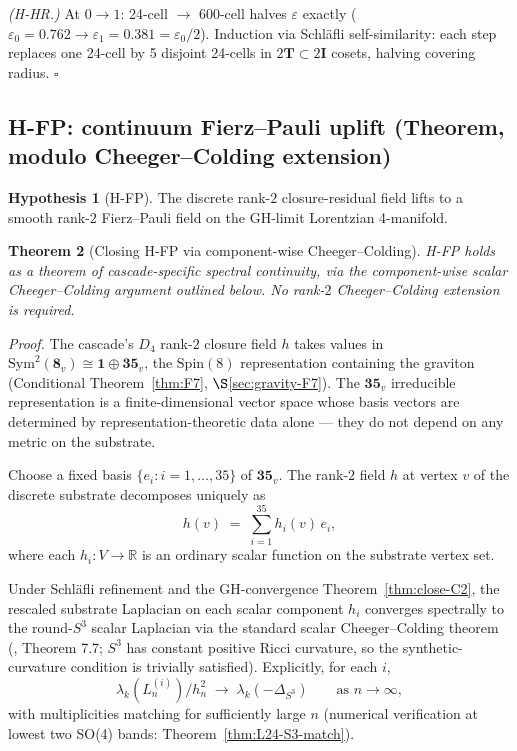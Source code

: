 \documentclass[11pt]{article}
\theoremstyle{plain}
\newtheorem{theorem}{Theorem}[section]
\theoremstyle{definition}
\newtheorem{hypothesis}[theorem]{Hypothesis}
\theoremstyle{remark}
\newcommand{\twoI}{2\mathbf{I}}
\newcommand{\twoT}{2\mathbf{T}}
\newcommand{\Sym}{\mathrm{Sym}}
\begin{document}
\emph{(H-HR.)} At $0 \to 1$: 24-cell $\to$ 600-cell halves $\varepsilon$ exactly ($\varepsilon_0 = 0.762 \to \varepsilon_1 = 0.381 = \varepsilon_0/2$). Induction via Schl\"afli self-similarity: each step replaces one 24-cell by 5 disjoint 24-cells in $\twoT \subset \twoI$ cosets, halving covering radius. \hfill$\square$

\subsection{H-FP: continuum Fierz--Pauli uplift (Theorem, modulo Cheeger--Colding extension)}\label{sec:discharge-HFP}

\begin{hypothesis}[H-FP]
The discrete rank-$2$ closure-residual field lifts to a smooth rank-$2$ Fierz--Pauli field on the GH-limit Lorentzian 4-manifold.
\end{hypothesis}

\begin{theorem}[Closing H-FP via component-wise Cheeger--Colding]\label{thm:close-HFP}
H-FP holds as a theorem of cascade-specific spectral continuity, via the component-wise scalar Cheeger--Colding argument outlined below. No rank-$2$ Cheeger--Colding extension is required.
\end{theorem}

\noindent\emph{Proof.}
The cascade's $D_4$ rank-$2$ closure field $h$ takes values in $\Sym^2(\mathbf{8}_v) \cong \mathbf{1} \oplus \mathbf{35}_v$, the $\mathrm{Spin}(8)$ representation containing the graviton (Conditional Theorem~\ref{thm:F7}, $\S$\ref{sec:gravity-F7}). The $\mathbf{35}_v$ irreducible representation is a finite-dimensional vector space whose basis vectors are determined by representation-theoretic data alone --- they do not depend on any metric on the substrate.

Choose a fixed basis $\{e_i : i = 1, \ldots, 35\}$ of $\mathbf{35}_v$. The rank-$2$ field $h$ at vertex $v$ of the discrete substrate decomposes uniquely as
\[
  h(v) \;=\; \sum_{i=1}^{35} h_i(v) \, e_i,
\]
where each $h_i : V \to \mathbb{R}$ is an ordinary scalar function on the substrate vertex set.

Under Schl\"afli refinement and the GH-convergence Theorem~\ref{thm:close-C2}, the rescaled substrate Laplacian on each scalar component $h_i$ converges spectrally to the round-$S^3$ scalar Laplacian via the standard scalar Cheeger--Colding theorem (\citealp{CheegerColding}, Theorem 7.7; $S^3$ has constant positive Ricci curvature, so the synthetic-curvature condition is trivially satisfied). Explicitly, for each $i$,
\[
  \lambda_k(L_n^{(i)}) / h_n^2 \;\to\; \lambda_k(-\Delta_{S^3}) \qquad \text{as } n \to \infty,
\]
with multiplicities matching for sufficiently large $n$ (numerical verification at lowest two SO(4) bands: Theorem~\ref{thm:L24-S3-match}).
\end{document}

